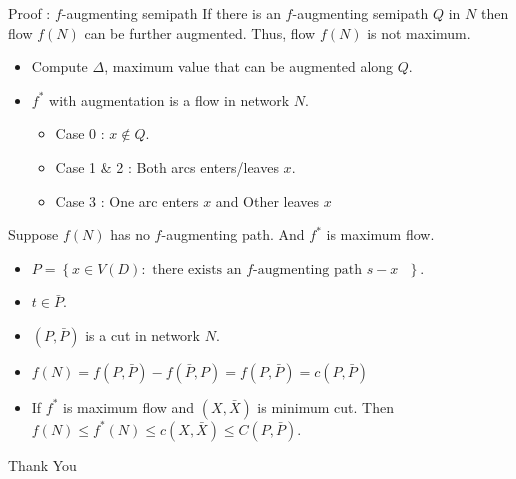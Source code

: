\documentclass{beamer}
\begin{document}
\begin{frame}{Proof : $f$-augmenting semipath}
	If there is an $f$-augmenting semipath $Q$ in $N$ then flow $f(N)$ can be further augmented. Thus, flow $f(N)$ is not maximum.
	\begin{itemize}
		\item Compute $\Delta$, maximum value that can be augmented along $Q$.
		\item $f^\ast$ with augmentation is a flow in network $N$.
		\begin{itemize}
			\item Case 0 : $x \notin Q$.
			\item Case 1 \& 2 : Both arcs enters/leaves $x$.
			\item Case 3 : One arc enters $x$ and Other leaves $x$
		\end{itemize}
	\end{itemize}
	\vfill	
	Suppose $f(N)$ has no $f$-augmenting path. And $f^\ast$ is maximum flow.
	\begin{itemize}
		\item $P = \left\{ x \in V(D) : \text{ there exists an $f$-augmenting path $s-x$ } \right\}$.
		\item $t \in \bar{P}$.
		\item $(P,\bar{P})$ is a cut in network $N$.
		\item $f(N) = f(P,\bar{P})-f(\bar{P},P) = f(P,\bar{P}) = c(P,\bar{P})$
		\item If $f^\ast$ is maximum flow and $(X,\bar{X})$ is minimum cut. Then $f(N) \le f^\ast(N) \le c(X,\bar{X}) \le C(P,\bar{P})$.
	\end{itemize}
\end{frame}

\begin{frame}
	\vspace{0.6in}
	\hspace{3cm} {\color{blue}\Huge{Thank You}}
\end{frame}
\end{document}
